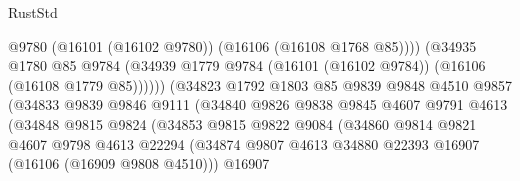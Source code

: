 \begin{lexlean}{RustStd}
\begin{coremodule}
                                          @9780
                                          (@16101 (@16102 @9780))
                                          (@16106 (@16108 @1768 @85))))
                                      (@34935
                                        @1780
                                        @85
                                        @9784
                                        (@34939
                                          @1779
                                          @9784
                                          (@16101 (@16102 @9784))
                                          (@16106 (@16108 @1779 @85))))))
                                  (@34823
                                    @1792
                                    @1803
                                    @85
                                    @9839
                                    @9848
                                    @4510
                                    @9857
                                    (@34833
                                      @9839
                                      @9846
                                      @9111
                                      (@34840
                                        @9826
                                        @9838
                                        @9845
                                        @4607
                                        @9791
                                        @4613
                                        (@34848
                                          @9815
                                          @9824
                                          (@34853
                                            @9815
                                            @9822
                                            @9084
                                            (@34860
                                              @9814
                                              @9821
                                              @4607
                                              @9798
                                              @4613
                                              @22294
                                              (@34874
                                                @9807
                                                @4613
                                                @34880
                                                @22393
                                                @16907
                                                (@16106 (@16909 @9808 @4510)))
                                              @16907

\end{coremodule}
\end{lexlean}
